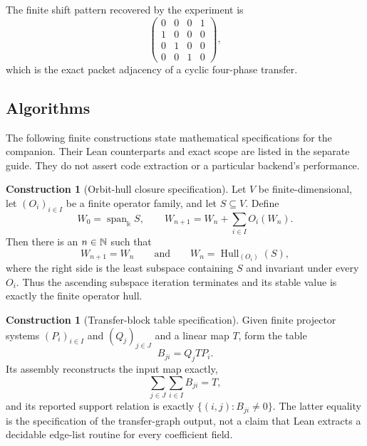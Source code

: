 \documentclass[11pt]{article}
\theoremstyle{definition}
\theoremstyle{remark}
\theoremstyle{definition}\newtheorem{example}[theorem]{Example}
\newtheorem{construction}[theorem]{Construction}
\newcommand{\bbk}{\Bbbk}
\newcommand{\Hull}{\operatorname{Hull}}
\newcommand{\Span}{\operatorname{span}}
\begin{document}
The finite shift pattern recovered by the experiment is
\[
\begin{pmatrix}
0&0&0&1\\
1&0&0&0\\
0&1&0&0\\
0&0&1&0
\end{pmatrix},
\]
which is the exact packet adjacency of a cyclic four-phase transfer.

\subsection{Algorithms}

The following finite constructions state mathematical specifications for the companion. Their Lean counterparts and exact scope are listed in the separate guide. They do not assert code extraction or a particular backend's performance.

\begin{construction}[Orbit-hull closure specification]
\label{con:orbit-hull-algorithm}
Let $V$ be finite-dimensional, let $(O_i)_{i\in I}$ be a finite operator
family, and let $S\subseteq V$.  Define
\[
W_0=\Span_{\bbk}S,
\qquad
W_{n+1}=W_n+\sum_{i\in I}O_i(W_n).
\]
Then there is an $n\in\mathbb N$ such that
\[
W_{n+1}=W_n
\qquad\text{and}\qquad
W_n=\Hull_{(O_i)}(S),
\]
where the right side is the least subspace containing $S$ and invariant under
every $O_i$.  Thus the ascending subspace iteration terminates and its stable
value is exactly the finite operator hull.
\end{construction}

\begin{construction}[Transfer-block table specification]
\label{con:transfer-block-algorithm}
Given finite projector systems $(P_i)_{i\in I}$ and $(Q_j)_{j\in J}$ and a
linear map $T$, form the table
\[
B_{ji}=Q_jTP_i.
\]
Its assembly reconstructs the input map exactly,
\[
\sum_{j\in J}\sum_{i\in I}B_{ji}=T,
\]
and its reported support relation is exactly
$\{(i,j):B_{ji}\ne0\}$.  The latter equality is the specification of the
transfer-graph output, not a claim that Lean extracts a decidable edge-list
routine for every coefficient field.
\end{construction}
\end{document}
